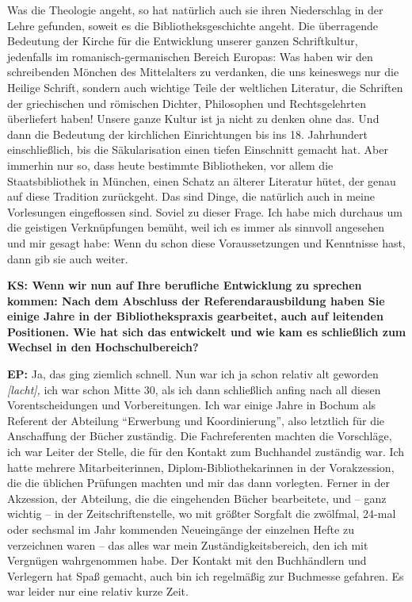 \documentclass[a4paper,
fontsize=11pt,
oneside,
numbers=noperiodatend,
parskip=half-,
bibliography=totoc,
final
]{scrartcl}
\begin{document}
Was die Theologie angeht, so hat natürlich auch sie ihren Niederschlag
in der Lehre gefunden, soweit es die Bibliotheksgeschichte angeht. Die
überragende Bedeutung der Kirche für die Entwicklung unserer ganzen
Schriftkultur, jedenfalls im romanisch-germanischen Bereich Europas: Was
haben wir den schreibenden Mönchen des Mittelalters zu verdanken, die
uns keineswegs nur die Heilige Schrift, sondern auch wichtige Teile der
weltlichen Literatur, die Schriften der griechischen und römischen
Dichter, Philosophen und Rechtsgelehrten überliefert haben! Unsere ganze
Kultur ist ja nicht zu denken ohne das. Und dann die Bedeutung der
kirchlichen Einrichtungen bis ins 18. Jahrhundert einschließlich, bis
die Säkularisation einen tiefen Einschnitt gemacht hat. Aber immerhin
nur so, dass heute bestimmte Bibliotheken, vor allem die
Staatsbibliothek in München, einen Schatz an älterer Literatur hütet,
der genau auf diese Tradition zurückgeht. Das sind Dinge, die natürlich
auch in meine Vorlesungen eingeflossen sind. Soviel zu dieser Frage. Ich
habe mich durchaus um die geistigen Verknüpfungen bemüht, weil ich es
immer als sinnvoll angesehen und mir gesagt habe: Wenn du schon diese
Voraussetzungen und Kenntnisse hast, dann gib sie auch weiter.

\textbf{KS: Wenn wir nun auf Ihre berufliche Entwicklung zu sprechen
kommen: Nach dem Abschluss der Referendarausbildung haben Sie einige
Jahre in der Bibliothekspraxis gearbeitet, auch auf leitenden
Positionen. Wie hat sich das entwickelt und wie kam es schließlich zum
Wechsel in den Hochschulbereich?}

\textbf{EP:} Ja, das ging ziemlich schnell. Nun war ich ja schon relativ
alt geworden \emph{{[}lacht{]},} ich war schon Mitte 30, als ich dann
schließlich anfing nach all diesen Vorentscheidungen und Vorbereitungen.
Ich war einige Jahre in Bochum als Referent der Abteilung
\enquote{Erwerbung und Koordinierung}, also letztlich für die
Anschaffung der Bücher zuständig. Die Fachreferenten machten die
Vorschläge, ich war Leiter der Stelle, die für den Kontakt zum
Buchhandel zuständig war. Ich hatte mehrere Mitarbeiterinnen,
Diplom-Bibliothekarinnen in der Vorakzession, die die üblichen Prüfungen
machten und mir das dann vorlegten. Ferner in der Akzession, der
Abteilung, die die eingehenden Bücher bearbeitete, und -- ganz wichtig
-- in der Zeitschriftenstelle, wo mit größter Sorgfalt die zwölfmal,
24-mal oder sechsmal im Jahr kommenden Neueingänge der einzelnen Hefte
zu verzeichnen waren -- das alles war mein Zuständigkeitsbereich, den
ich mit Vergnügen wahrgenommen habe. Der Kontakt mit den Buchhändlern
und Verlegern hat Spaß gemacht, auch bin ich regelmäßig zur Buchmesse
gefahren. Es war leider nur eine relativ kurze Zeit.
\end{document}
